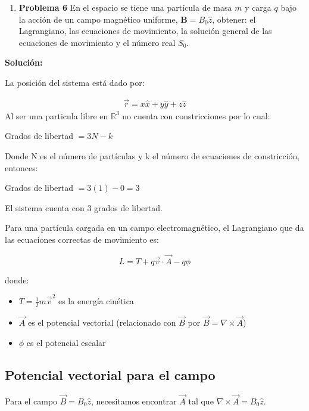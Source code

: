\documentclass{article}
\begin{document}
\begin{enumerate}[label={{\textcolor{trueblue}{\textbf{Pr.} \arabic*.6}}}, start=2]
  \item \textbf{Problema 6} En el espacio se tiene una partícula de masa $m$ y carga $q$ bajo la acción de un campo magnético uniforme, $\boldsymbol{B}=B_{0}\hat{z}$, obtener: el Lagrangiano, las ecuaciones de movimiento, la solución general de las ecuaciones de movimiento y el número real $S_{0}$.
\end{enumerate}

\textcolor{Cinnabar}{\textbf{Soluci\'on:}} 


La posición del sistema está dado por: 

\begin{align}
    \vec{r}= x\hat{x}+ y\hat{y} + z\hat{z} 
\end{align}
Al ser una particula libre en $\mathbb{R}^3$ no cuenta con constricciones por lo cual: 

Grados de libertad $= 3N - k$

Donde N es el número de partículas y k el número de ecuaciones de constricción, entonces: 

Grados de libertad $= 3(1)-0 =3$

El sistema cuenta con $3$ grados de libertad. 

Para una partícula cargada en un campo electromagnético, el Lagrangiano que da las ecuaciones correctas de movimiento es:

\begin{equation}
L = T + q\vec{v} \cdot \vec{A} - q\phi
\end{equation}

donde:
\begin{itemize}
\item[$\bullet$] $T = \frac{1}{2}m\vec{v}^2$ es la energía cinética
\item[$\bullet$] $\vec{A}$ es el potencial vectorial (relacionado con $\vec{B}$ por $\vec{B} = \nabla \times \vec{A}$)
\item[$\bullet$] $\phi$ es el potencial escalar
\end{itemize}

\subsection*{Potencial vectorial para el campo }

Para el campo $\vec{B} = B_0\hat{z}$, necesitamos encontrar $\vec{A}$ tal que $\nabla \times \vec{A} = B_0\hat{z}$.
\end{document}
